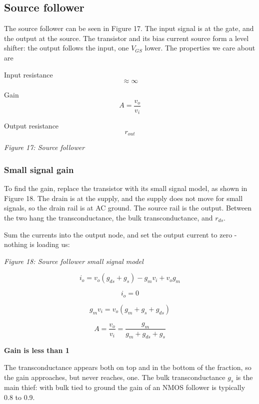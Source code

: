 \subsection{Source follower}\label{source-follower}

The source follower can be seen in Figure 17. The input signal is at the
gate, and the output at the source. The transistor and its bias current
source form a level shifter: the output follows the input, one
\(V_{GS}\) lower. The properties we care about are

Input resistance \[\approx \infty\]

Gain \[ A = \frac{v_o}{v_i}\]

Output resistance \[r_{out}\]


{
\centering
{}
}

\emph{Figure 17: Source follower }

\subsubsection{Small signal gain}\label{small-signal-gain}

To find the gain, replace the transistor with its small signal model, as
shown in Figure 18. The drain is at the supply, and the supply does not
move for small signals, so the drain rail is at AC ground. The source
rail is the output. Between the two hang the transconductance, the bulk
transconductance, and \(r_{ds}\).

Sum the currents into the output node, and set the output current to
zero - nothing is loading us:


{
\centering
{}
}

\emph{Figure 18: Source follower small signal model}

\[ i_o = v_o (g_{ds} + g_{s}) - g_{m} v_i + v_o g_m \]

\[ i_o = 0 \]

\[ g_m v_i = v_o ( g_m + g_s + g_{ds} ) \]

\[ A = \frac{v_o}{v_i} = \frac{g_m}{g_m + g_{ds} + g_s} \]

\textbf{Gain is less than 1}

The transconductance appears both on top and in the bottom of the
fraction, so the gain approaches, but never reaches, one. The bulk
transconductance \(g_s\) is the main thief: with bulk tied to ground the
gain of an NMOS follower is typically 0.8 to 0.9.

